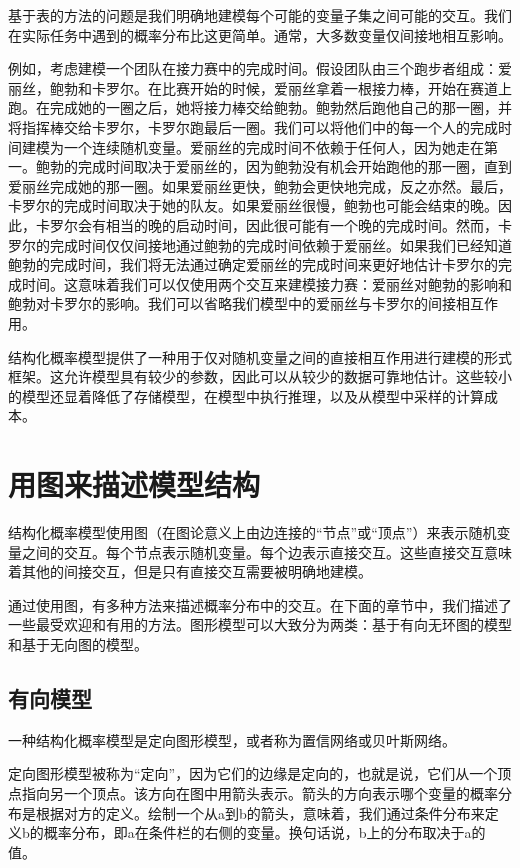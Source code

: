 基于表的方法的问题是我们明确地建模每个可能的变量子集之间可能的交互。我们在实际任务中遇到的概率分布比这更简单。通常，大多数变量仅间接地相互影响。

例如，考虑建模一个团队在接力赛中的完成时间。假设团队由三个跑步者组成：爱丽丝，鲍勃和卡罗尔。在比赛开始的时候，爱丽丝拿着一根接力棒，开始在赛道上跑。在完成她的一圈之后，她将接力棒交给鲍勃。鲍勃然后跑他自己的那一圈，并将指挥棒交给卡罗尔，卡罗尔跑最后一圈。我们可以将他们中的每一个人的完成时间建模为一个连续随机变量。爱丽丝的完成时间不依赖于任何人，因为她走在第一。鲍勃的完成时间取决于爱丽丝的，因为鲍勃没有机会开始跑他的那一圈，直到爱丽丝完成她的那一圈。如果爱丽丝更快，鲍勃会更快地完成，反之亦然。最后，卡罗尔的完成时间取决于她的队友。如果爱丽丝很慢，鲍勃也可能会结束的晚。因此，卡罗尔会有相当的晚的启动时间，因此很可能有一个晚的完成时间。然而，卡罗尔的完成时间仅仅间接地通过鲍勃的完成时间依赖于爱丽丝。如果我们已经知道鲍勃的完成时间，我们将无法通过确定爱丽丝的完成时间来更好地估计卡罗尔的完成时间。这意味着我们可以仅使用两个交互来建模接力赛：爱丽丝对鲍勃的影响和鲍勃对卡罗尔的影响。我们可以省略我们模型中的爱丽丝与卡罗尔的间接相互作用。

结构化概率模型提供了一种用于仅对随机变量之间的直接相互作用进行建模的形式框架。这允许模型具有较少的参数，因此可以从较少的数据可靠地估计。这些较小的模型还显着降低了存储模型，在模型中执行推理，以及从模型中采样的计算成本。

\section{用图来描述模型结构}
结构化概率模型使用图（在图论意义上由边连接的“节点”或“顶点”）来表示随机变量之间的交互。每个节点表示随机变量。每个边表示直接交互。这些直接交互意味着其他的间接交互，但是只有直接交互需要被明确地建模。

通过使用图，有多种方法来描述概率分布中的交互。在下面的章节中，我们描述了一些最受欢迎和有用的方法。图形模型可以大致分为两类：基于有向无环图的模型和基于无向图的模型。

\subsection{有向模型}
一种结构化概率模型是定向图形模型，或者称为置信网络或贝叶斯网络。

定向图形模型被称为“定向”，因为它们的边缘是定向的，也就是说，它们从一个顶点指向另一个顶点。该方向在图中用箭头表示。箭头的方向表示哪个变量的概率分布是根据对方的定义。绘制一个从a到b的箭头，意味着，我们通过条件分布来定义b的概率分布，即a在条件栏的右侧的变量。换句话说，b上的分布取决于a的值。






